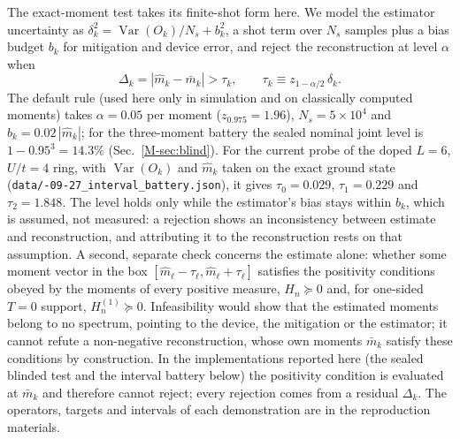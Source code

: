 \documentclass[aps,prb,onecolumn,superscriptaddress,longbibliography,floatfix]{revtex4-2}
\begin{document}
The exact-moment test takes its finite-shot form here. We model the estimator uncertainty as $\delta_k^2=\operatorname{Var}(O_k)/N_s+b_k^2$, a shot term over $N_s$ samples plus a bias budget $b_k$ for mitigation and device error, and reject the reconstruction at level $\alpha$ when
\[
\Delta_k=|\widehat{m}_k-\bar m_k|>\tau_k,\qquad \tau_k\equiv z_{1-\alpha/2}\,\delta_k .
\]
The default rule (used here only in simulation and on classically computed moments) takes $\alpha=0.05$ per moment ($z_{0.975}=1.96$), $N_s=5\times10^4$ and $b_k=0.02\,|\widehat m_k|$; for the three-moment battery the sealed nominal joint level is ${1-0.95^3=14.3\%}$ (Sec.~\ref{M-sec:blind}). For the current probe of the doped $L=6$, $U/t=4$ ring, with $\operatorname{Var}(O_k)$ and $\widehat m_k$ taken on the exact ground state (\texttt{data/-09-27\_interval\_battery.json}), it gives $\tau_0=0.029$, $\tau_1=0.229$ and $\tau_2=1.848$. The level holds only while the estimator's bias stays within $b_k$, which is assumed, not measured: a rejection shows an inconsistency between estimate and reconstruction, and attributing it to the reconstruction rests on that assumption. A second, separate check concerns the estimate alone: whether some moment vector in the box $[\widehat m_\ell-\tau_\ell,\widehat m_\ell+\tau_\ell]$ satisfies the positivity conditions obeyed by the moments of every positive measure, $H_n\succeq0$ and, for one-sided $T=0$ support, $H_n^{(1)}\succeq0$. Infeasibility would show that the estimated moments belong to no spectrum, pointing to the device, the mitigation or the estimator; it cannot refute a non-negative reconstruction, whose own moments $\bar m_k$ satisfy these conditions by construction. In the implementations reported here (the sealed blinded test and the interval battery below) the positivity condition is evaluated at $\bar m_k$ and therefore cannot reject; every rejection comes from a residual $\Delta_k$. The operators, targets and intervals of each demonstration are in the reproduction materials.
\end{document}
